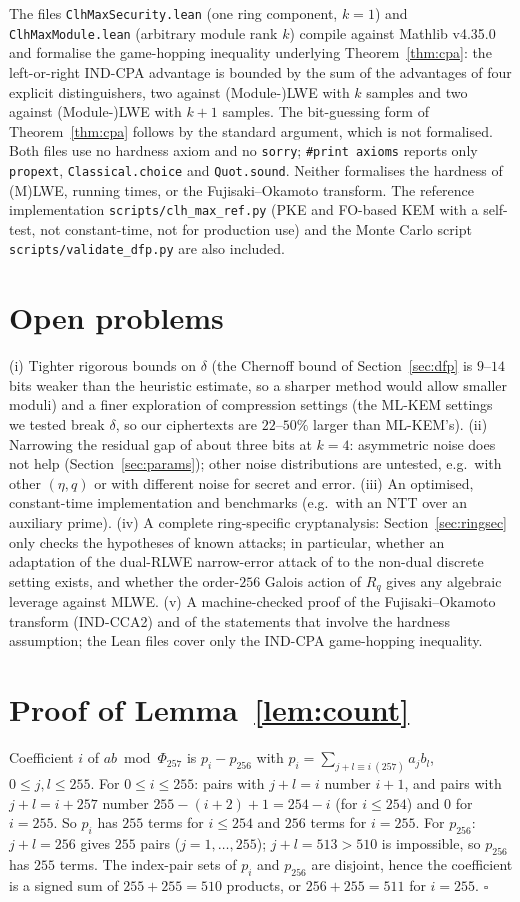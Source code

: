 \documentclass[11pt]{article}
\theoremstyle{remark}
\newcommand{\Rq}{R_q}
\begin{document}
The files \texttt{ClhMaxSecurity.lean} (one ring component, $k=1$) and \texttt{ClhMaxModule.lean} (arbitrary module rank $k$) compile against Mathlib v4.35.0 and formalise the game-hopping inequality underlying Theorem~\ref{thm:cpa}: the left-or-right IND-CPA advantage is bounded by the sum of the advantages of four explicit distinguishers, two against (Module-)LWE with $k$ samples and two against (Module-)LWE with $k+1$ samples. The bit-guessing form of Theorem~\ref{thm:cpa} follows by the standard argument, which is not formalised. Both files use no hardness axiom and no \texttt{sorry}; \texttt{\#print axioms} reports only \texttt{propext}, \texttt{Classical.choice} and \texttt{Quot.sound}. Neither formalises the hardness of (M)LWE, running times, or the Fujisaki--Okamoto transform. The reference implementation \texttt{scripts/clh\_max\_ref.py} (PKE and FO-based KEM with a self-test, not constant-time, not for production use) and the Monte Carlo script \texttt{scripts/validate\_dfp.py} are also included.

\section{Open problems}
(i) Tighter rigorous bounds on $\delta$ (the Chernoff bound of Section~\ref{sec:dfp} is $9$--$14$ bits weaker than the heuristic estimate, so a sharper method would allow smaller moduli) and a finer exploration of compression settings (the ML-KEM settings we tested break $\delta$, so our ciphertexts are $22$--$50\%$ larger than ML-KEM's). (ii) Narrowing the residual gap of about three bits at $k=4$: asymmetric noise does not help (Section~\ref{sec:params}); other noise distributions are untested, e.g.\ with other $(\eta,q)$ or with different noise for secret and error. (iii) An optimised, constant-time implementation and benchmarks (e.g.\ with an NTT over an auxiliary prime). (iv) A complete ring-specific cryptanalysis: Section~\ref{sec:ringsec} only checks the hypotheses of known attacks; in particular, whether an adaptation of the dual-RLWE narrow-error attack of \cite{CLS17} to the non-dual discrete setting exists, and whether the order-$256$ Galois action of $\Rq$ gives any algebraic leverage against MLWE. (v) A machine-checked proof of the Fujisaki--Okamoto transform (IND-CCA2) and of the statements that involve the hardness assumption; the Lean files cover only the IND-CPA game-hopping inequality.

\appendix
\section{Proof of Lemma~\ref{lem:count}}\label{app:count}
Coefficient $i$ of $ab\bmod\Phi_{257}$ is $p_i-p_{256}$ with $p_i=\sum_{j+l\equiv i\ (257)}a_jb_l$, $0\le j,l\le255$. For $0\le i\le255$: pairs with $j+l=i$ number $i+1$, and pairs with $j+l=i+257$ number $255-(i+2)+1=254-i$ (for $i\le254$) and $0$ for $i=255$. So $p_i$ has $255$ terms for $i\le254$ and $256$ terms for $i=255$. For $p_{256}$: $j+l=256$ gives $255$ pairs ($j=1,\dots,255$); $j+l=513>510$ is impossible, so $p_{256}$ has $255$ terms. The index-pair sets of $p_i$ and $p_{256}$ are disjoint, hence the coefficient is a signed sum of $255+255=510$ products, or $256+255=511$ for $i=255$. $\square$
\end{document}

